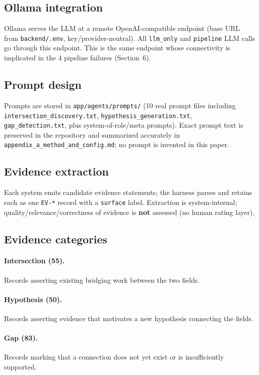 \documentclass[11pt]{article}
\begin{document}
\subsection{Ollama integration}
\label{sec:ollama}
Ollama serves the LLM at a remote OpenAI-compatible endpoint (base URL from
\texttt{backend/.env}, key/provider-neutral). All \texttt{llm\_only} and
\texttt{pipeline} LLM calls go through this endpoint. This is the same endpoint
whose connectivity is implicated in the 4 pipeline failures (Section~6).

\subsection{Prompt design}
\label{sec:prompts}
Prompts are stored in \texttt{app/agents/prompts/} (10 real prompt files
including \texttt{intersection\_discovery.txt}, \texttt{hypothesis\_generation.txt},
\texttt{gap\_detection.txt}, plus system-of-role/meta prompts). Exact prompt text
is preserved in the repository and summarized accurately in
\texttt{appendix\_a\_method\_and\_config.md}; no prompt is invented in this paper.

\subsection{Evidence extraction}
\label{sec:extract}
Each system emits candidate evidence statements; the harness parses and retains
each as one \texttt{EV-*} record with a \texttt{surface} label. Extraction is
system-internal; quality/relevance/correctness of evidence is \textbf{not}
assessed (no human rating layer).

\subsection{Evidence categories}
\label{sec:categories}
\paragraph{Intersection (55).} Records asserting existing bridging work between
the two fields.
\paragraph{Hypothesis (50).} Records asserting evidence that motivates a new
hypothesis connecting the fields.
\paragraph{Gap (83).} Records marking that a connection does not yet exist or is
insufficiently supported.
\end{document}
